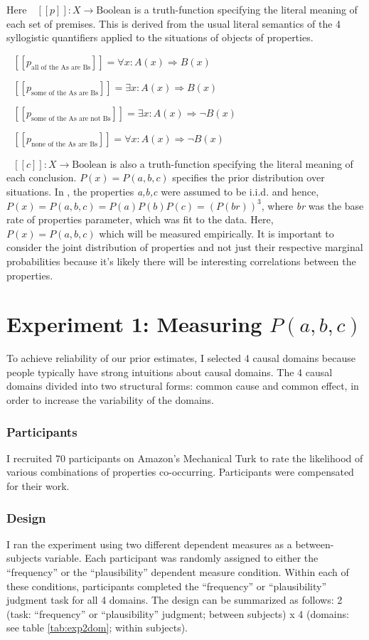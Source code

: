 \documentclass{llncs} %
\newcommand{\denote}[1]{\mbox{ $[\![ #1 ]\!]$}}
\begin{document}
Here $\denote{p}: X \rightarrow \text{Boolean}$ is a truth-function specifying the literal meaning of each set of premises. This is derived from the 
usual literal semantics of the 4 syllogistic quantifiers applied to the situations of objects of properties. 

$\denote{p_{\textrm{all of the As are Bs}}}=\forall{x}: A(x) \Rightarrow B(x)$

$\denote{p_{\textrm{some of the As are Bs}}}= \exists{x}: A(x) \Rightarrow B(x)$

$\denote{p_{\textrm{some of the As are not Bs}}}= \exists{x}: A(x) \Rightarrow \neg{B(x)}$

$\denote{p_{\textrm{none of the As are Bs}}}= \forall{x}: A(x) \Rightarrow \neg{B(x)}$

$\denote{c}: X \rightarrow \text{Boolean}$ is also a truth-function specifying the literal meaning of each conclusion. $P(x) = P(a,b,c)$ specifies the prior distribution over situations. In , the properties \emph{a,b,c} were assumed to be i.i.d. and hence, $P(x) = P(a, b, c) = P(a)P(b)P(c) = (P(br))^3$, where \emph{br} was the base rate of properties parameter, which was fit to the data. Here, $P(x) = P(a,b,c)$ which will be measured empirically. It is important to consider the joint distribution of properties and not just their respective marginal probabilities because it's likely there will be interesting correlations between the properties.

\section{Experiment 1: Measuring $P(a,b,c)$}
\label{prelicit}

To achieve reliability of our prior estimates, I selected 4 causal domains because people typically have strong intuitions about causal domains. The 4 causal domains divided into two structural forms: common cause and common effect, in order to increase the variability of the domains. 

\subsubsection{Participants}

I recruited 70 participants on Amazon's Mechanical Turk to rate the likelihood of various combinations of properties co-occurring. Participants were compensated for their work.
\subsubsection{Design}
I ran the experiment using two different dependent measures as a between-subjects variable. Each participant was randomly assigned to either the ``frequency'' or the ``plausibility'' dependent measure condition. Within each of these conditions, participants completed the ``frequency'' or ``plausibility'' judgment task for all 4 domains. The design can be summarized as follows: 2 (task: ``frequency'' or ``plausibility'' judgment; between subjects) x 4 (domains: see table \ref{tab:exp2dom}; within subjects).
\end{document}
